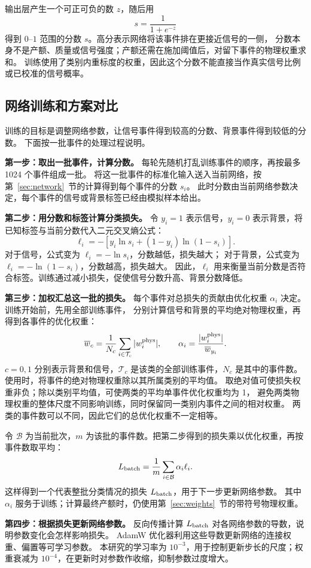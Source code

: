 \documentclass[11pt,a4paper,fontset=fandol,scheme=plain]{ctexart}
\begin{document}
输出层产生一个可正可负的数 $z$，随后用
\[
 s=\frac{1}{1+e^{-z}}
\]
得到 $0$--$1$ 范围的分数 $s$。高分表示网络将该事件排在更接近信号的一侧，
分数本身不是产额、质量或信号强度；产额还需在施加阈值后，对留下事件的物理权重求和。
训练使用了类别内重标度的权重，因此这个分数不能直接当作真实信号比例或已校准的信号概率。

\subsection{网络训练和方案对比}

训练的目标是调整网络参数，让信号事件得到较高的分数、背景事件得到较低的分数。
下面按一批事件的处理过程说明。

\textbf{第一步：取出一批事件，计算分数。}
每轮先随机打乱训练事件的顺序，再按最多 1024 个事件组成一批。
将这一批事件的标准化输入送入当前网络，按第~\ref{sec:network}~节的计算得到每个事件的分数 $s_i$。
此时分数由当前网络参数决定，每个事件的信号或背景标签已经由模拟样本给出。

\textbf{第二步：用分数和标签计算分类损失。}
令 $y_i=1$ 表示信号，$y_i=0$ 表示背景，将已知标签与当前分数代入二元交叉熵公式：
\[
 \ell_i=-\left[y_i\ln s_i+(1-y_i)\ln(1-s_i)\right].
\]
对于信号，公式变为 $\ell_i=-\ln s_i$，分数越低，损失越大；
对于背景，公式变为 $\ell_i=-\ln(1-s_i)$，分数越高，损失越大。
因此，$\ell_i$ 用来衡量当前分数是否符合标签。训练通过减小损失，促使信号分数升高、背景分数降低。

\textbf{第三步：加权汇总这一批的损失。}
每个事件对总损失的贡献由优化权重 $\alpha_i$ 决定。训练开始前，先用全部训练事件，
分别计算信号和背景的平均绝对物理权重，再得到各事件的优化权重：
\[
 \overline w_c=\frac{1}{N_c}\sum_{i\in\mathcal T_c}|w_i^{\rm phys}|,
 \qquad
 \alpha_i=\frac{|w_i^{\rm phys}|}{\overline w_{y_i}}.
\]
$c=0,1$ 分别表示背景和信号，$\mathcal T_c$ 是该类的全部训练事件，$N_c$ 是其中的事件数。
使用时，将事件的绝对物理权重除以其所属类别的平均值。
取绝对值可使损失权重非负；除以类别平均值，可使两类的平均单事件优化权重均为 1，
避免两类物理权重的整体尺度不同影响训练，同时保留同一类别内事件之间的相对权重。
两类的事件数可以不同，因此它们的总优化权重不一定相等。

令 $\mathcal B$ 为当前批次，$m$ 为该批的事件数。把第二步得到的损失乘以优化权重，再按事件数取平均：
\[
 L_{\rm batch}=\frac{1}{m}\sum_{i\in\mathcal B}\alpha_i\ell_i.
\]
这样得到一个代表整批分类情况的损失 $L_{\rm batch}$，用于下一步更新网络参数。
其中 $\alpha_i$ 服务于训练；计算最终产额时，仍使用第~\ref{sec:weights}~节的带符号物理权重。

\textbf{第四步：根据损失更新网络参数。}
反向传播计算 $L_{\rm batch}$ 对各网络参数的导数，说明参数变化会怎样影响损失。
AdamW 优化器利用这些导数更新网络的连接权重、偏置等可学习参数。
本研究的学习率为 $10^{-3}$，用于控制更新步长的尺度；权重衰减为 $10^{-4}$，在更新时对参数作收缩，抑制参数过度增大。
\end{document}
